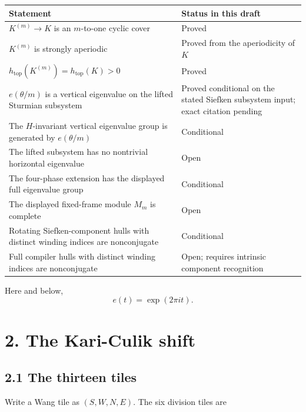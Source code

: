 \documentclass[11pt]{article}
\begin{document}
\begin{center}
\begin{tabularx}{\textwidth}{@{}>{\raggedright\arraybackslash}X>{\raggedright\arraybackslash}X@{}}
\toprule
Statement & Status in this draft \\
\midrule
\(K^{(m)}\to K\) is an \(m\)-to-one cyclic cover & Proved \\
\(K^{(m)}\) is strongly aperiodic & Proved from the aperiodicity of \(K\) \\
\(h_{\mathrm{top}}(K^{(m)})=h_{\mathrm{top}}(K)>0\) & Proved \\
\(e(\theta/m)\) is a vertical eigenvalue on the lifted Sturmian subsystem & Proved conditional on the stated Siefken subsystem input; exact citation pending \\
The \(H\)-invariant vertical eigenvalue group is generated by \(e(\theta/m)\) & Conditional \\
The lifted subsystem has no nontrivial horizontal eigenvalue & Open \\
The four-phase extension has the displayed full eigenvalue group & Conditional \\
The displayed fixed-frame module \(M_m\) is complete & Open \\
Rotating Siefken-component hulls with distinct winding indices are nonconjugate & Conditional \\
Full compiler hulls with distinct winding indices are nonconjugate & Open; requires intrinsic component recognition \\
\bottomrule
\end{tabularx}
\end{center}

Here and below,
\[
  e(t)=\exp(2\pi i t).
\]

\section*{2. The Kari-Culik shift}

\subsection*{2.1 The thirteen tiles}

Write a Wang tile as \((S,W,N,E)\). The six division tiles are

\begin{center}
\end{center}
\end{document}
